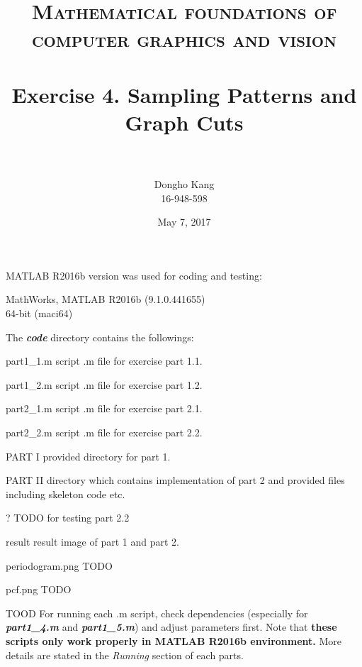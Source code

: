 \documentclass[paper=a4, fontsize=11pt]{scrartcl} %
\title{	
\normalfont \normalsize 
\textsc{Mathematical foundations of computer graphics and vision} \\ [25pt] %
\horrule{0.5pt} \\[0.4cm] %
\huge Exercise 4. Sampling Patterns and Graph Cuts\\ %
\horrule{2pt} \\[0.5cm] %
}
\author{Dongho Kang \\ \small 16-948-598} %
\date{\normalsize May 7, 2017} %
\numberwithin{equation}{section} %
\numberwithin{figure}{section} %
\numberwithin{table}{section} %
\newcommand{\filename}[1]{\textbf{\textit{#1}}}
\begin{document}
\maketitle %


MATLAB R2016b version was used for coding and testing:

\begin{center}
MathWorks, MATLAB R2016b (9.1.0.441655) \\
64-bit (maci64) 
\end{center}

The \filename{code} directory contains the followings:

\begin{filedescription}
	\item [part1\_1.m] script .m file for exercise part 1.1.
	\item [part1\_2.m] script .m file for exercise part 1.2.
	\item [part2\_1.m] script .m file for exercise part 2.1. 
	\item [part2\_2.m] script .m file for exercise part 2.2. 
	\item [PART I] provided directory for part 1.
	\item [PART II] directory which contains implementation of part 2 and provided files including skeleton code etc.
	\item [?] TODO for testing part 2.2   
	\item [result] result image of part 1 and part 2.
		\begin{filedescription}
			\item [periodogram.png] TODO
			\item [pcf.png]			TODO
		\end{filedescription} 
\end{filedescription}

TOOD
For running each .m script, check dependencies (especially for \filename{part1\_4.m} and \filename{part1\_5.m}) and adjust parameters first. Note that \textbf{these scripts only work properly in MATLAB R2016b environment.} More details are stated in the \textit{Running} section of each parts.

\end{document}
